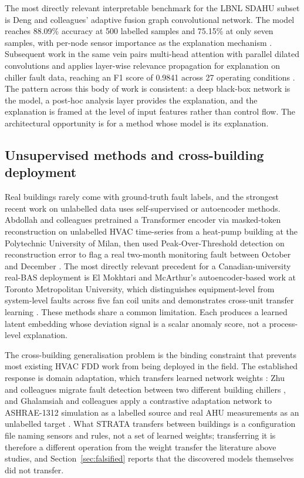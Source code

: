 \documentclass[11pt,letterpaper]{article}
\begin{document}
The most directly relevant interpretable benchmark for the LBNL SDAHU subset is Deng and colleagues' adaptive fusion graph convolutional network. The model reaches 88.09\% accuracy at 500 labelled samples and 75.15\% at only seven samples, with per-node sensor importance as the explanation mechanism \cite{deng2024afgcn}. Subsequent work in the same vein pairs multi-head attention with parallel dilated convolutions and applies layer-wise relevance propagation for explanation on chiller fault data, reaching an F1 score of 0.9841 across 27 operating conditions \cite{wang2025xmhac}. The pattern across this body of work is consistent: a deep black-box network is the model, a post-hoc analysis layer provides the explanation, and the explanation is framed at the level of input features rather than control flow. The architectural opportunity is for a method whose model is its explanation.

\subsection{Unsupervised methods and cross-building deployment}

Real buildings rarely come with ground-truth fault labels, and the strongest recent work on unlabelled data uses self-supervised or autoencoder methods. Abdollah and colleagues pretrained a Transformer encoder via masked-token reconstruction on unlabelled HVAC time-series from a heat-pump building at the Polytechnic University of Milan, then used Peak-Over-Threshold detection on reconstruction error to flag a real two-month monitoring fault between October and December \cite{abdollah2024transformerssl}. The most directly relevant precedent for a Canadian-university real-BAS deployment is El Mokhtari and McArthur's autoencoder-based work at Toronto Metropolitan University, which distinguishes equipment-level from system-level faults across five fan coil units and demonstrates cross-unit transfer learning \cite{elmokhtari2024aebas}. These methods share a common limitation. Each produces a learned latent embedding whose deviation signal is a scalar anomaly score, not a process-level explanation.

The cross-building generalisation problem is the binding constraint that prevents most existing HVAC FDD work from being deployed in the field. The established response is domain adaptation, which transfers learned network weights \cite{lei2025crossbuildinguda,feng2024attentiontl}: Zhu and colleagues migrate fault detection between two different building chillers \cite{zhu2021chillertransfer}, and Ghalamsiah and colleagues apply a contrastive adaptation network to ASHRAE-1312 simulation as a labelled source and real AHU measurements as an unlabelled target \cite{ghalamsiah2025canhvac}. What STRATA transfers between buildings is a configuration file naming sensors and rules, not a set of learned weights; transferring it is therefore a different operation from the weight transfer the literature above studies, and Section~\ref{sec:falsified} reports that the discovered models themselves did not transfer.
\end{document}
